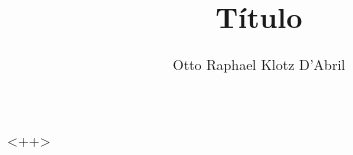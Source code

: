 \documentclass[%
a4paper,%
draft,%
]{trabalho}%
\author{Otto Raphael Klotz D'Abril}
\title{Título}
\begin{document}
%
%
\maketitle%
%
%
<++>
%
%
\end{document}
